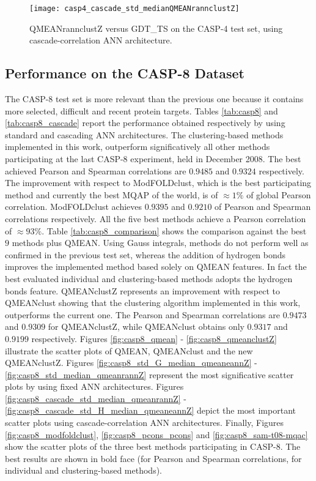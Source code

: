 \begin{figure}[H]
	\begin{center}
		\texttt{[image: casp4\_cascade\_std\_medianQMEANrannclustZ]}
		\caption[QMEANrannclustZ versus GDT\_TS on the CASP-4 test set, using ca\-sca\-de-\-cor\-re\-la\-tion ANN architecture]{QMEANrannclustZ versus GDT\_TS on the CASP-4 test set, using ca\-sca\-de-\-cor\-re\-la\-tion ANN architecture.}
\label{fig:casp4_cascade_std_medianQMEANrannclustZ}
	\end{center}
\end{figure}





\subsection{Performance on the CASP-8 Dataset}
\label{subsec:performance_on_the_casp8_dataset}
The CASP-8 test set is more relevant than the previous one because it contains more selected, difficult and recent protein targets. Tables \ref{tab:casp8} and \ref{tab:casp8_cascade} report the performance obtained respectively by using standard and cascading ANN architectures. The clustering-based methods implemented in this work, outperform significatively all other methods participating at the last CASP-8 experiment, held in December 2008. The best achieved Pearson and Spearman correlations are $0.9485$ and $0.9324$ respectively. The improvement with respect to ModFOLDclust, which is the best participating method and currently the best MQAP of the world, is of $\approx 1\%$ of global Pearson correlation. ModFOLDclust achieves $0.9395$ and $0.9210$ of Pearson and Spearman correlations respectively. All the five best methods achieve a Pearson correlation of $\approx 93\%$. Table \ref{tab:casp8_comparison} shows the comparison against the best $9$ methods plus QMEAN. Using Gauss integrals, methods do not perform well as confirmed in the previous test set, whereas the addition of hydrogen bonds improves the implemented method based solely on QMEAN features. In fact the best evaluated individual and clustering-based methods adopts the hydrogen bonds feature. QMEANclustZ represents an improvement with respect to QMEANclust showing that the clustering algorithm implemented in this work, outperforms the current one. The Pearson and Spearman correlations are $0.9473$ and $0.9309$ for QMEANclustZ, while QMEANclust obtains only $0.9317$ and $0.9199$ respectively. Figures \ref{fig:casp8_qmean} - \ref{fig:casp8_qmeanclustZ} illustrate the scatter plots of QMEAN, QMEANclust and the new QMEANclustZ. Figures \ref{fig:casp8_std_G_median_qmeaneannZ} - \ref{fig:casp8_std_median_qmeanrannZ} represent the most significative scatter plots by using fixed ANN architectures. Figures \ref{fig:casp8_cascade_std_median_qmeanrannZ} - \ref{fig:casp8_cascade_std_H_median_qmeaneannZ} depict the most important scatter plots using ca\-sca\-de-\-cor\-re\-la\-tion ANN architectures. Finally, Figures \ref{fig:casp8_modfoldclust}, \ref{fig:casp8_pcons_pcons} and \ref{fig:casp8_sam-t08-mqac} show the scatter plots of the three best methods participating in CASP-8. The best results are shown in bold face (for Pearson and Spearman correlations, for individual and clustering-based methods).\\
